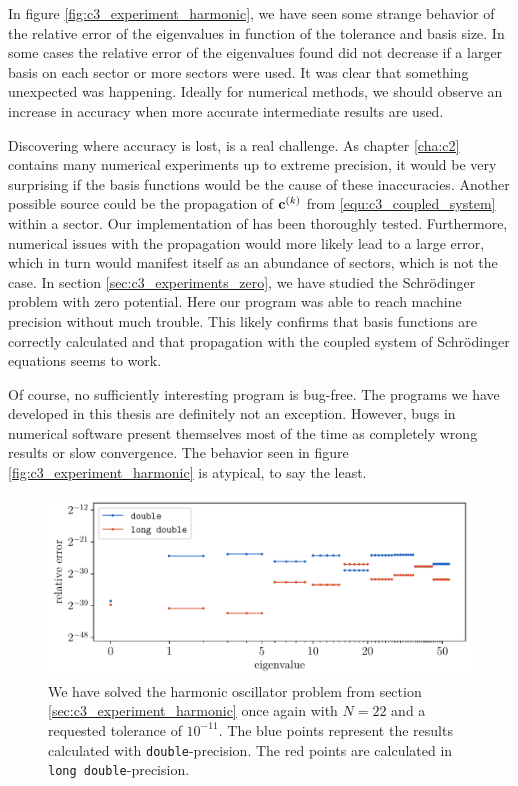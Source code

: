 In figure \ref{fig:c3_experiment_harmonic}, we have seen some strange behavior of the relative error of the eigenvalues in function of the tolerance and basis size. In some cases the relative error of the eigenvalues found did not decrease if a larger basis on each sector or more sectors were used. It was clear that something unexpected was happening. Ideally for numerical methods, we should observe an increase in accuracy when more accurate intermediate results are used.

Discovering where accuracy is lost, is a real challenge. As chapter \ref{cha:c2} contains many numerical experiments up to extreme precision, it would be very surprising if the basis functions would be the cause of these inaccuracies. Another possible source could be the propagation of $\vb{c}^{(k)}$ from \eqref{equ:c3_coupled_system} within a sector. Our implementation of \matscs{} has been thoroughly tested. Furthermore, numerical issues with the propagation would more likely lead to a large error, which in turn would manifest itself as an abundance of sectors, which is not the case. In section \ref{sec:c3_experiments_zero}, we have studied the Schrödinger problem with zero potential. Here our program was able to reach machine precision without much trouble. This likely confirms that basis functions are correctly calculated and that propagation with the coupled system of Schrödinger equations seems to work.

Of course, no sufficiently interesting program is bug-free. The programs we have developed in this thesis are definitely not an exception. However, bugs in numerical software present themselves most of the time as completely wrong results or slow convergence. The behavior seen in figure \ref{fig:c3_experiment_harmonic} is atypical, to say the least.

\begin{figure}
  \begin{center}
    \includegraphics[width=\textwidth]{img/chapter3/experiments/harmonic_analysis.pdf}
    \caption{We have solved the harmonic oscillator problem from section \ref{sec:c3_experiment_harmonic} once again with $N = 22$ and a requested tolerance of $10^{-11}$. The blue points represent the results calculated with \texttt{double}-precision. The red points are calculated in \texttt{long double}-precision.}\label{fig:c3_harmonic_analysis}
  \end{center}
\end{figure}


